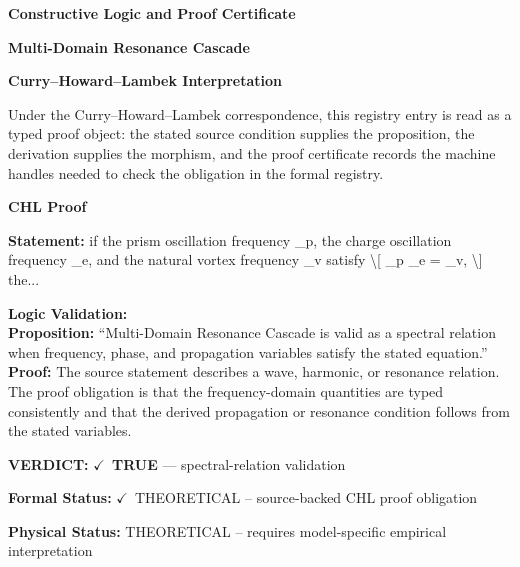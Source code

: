 \clearpage
\begingroup\tzpsupportsetup
\noindent\textbf{\fontsize{10.8pt}{12.8pt}\selectfont [ID 0127] Constructive Logic and Proof Certificate}\par
\noindent\textbf{\fontsize{10pt}{12pt}\selectfont Multi-Domain Resonance Cascade}\par
\vspace{0.45em}
\begingroup
\footnotesize
\setlength{\parskip}{0.22em}
\setlength{\parindent}{0pt}
\noindent\textbf{Curry--Howard--Lambek Interpretation}\par
Under the Curry--Howard--Lambek correspondence, this registry entry is read as a typed proof
object: the stated source condition supplies the proposition, the derivation supplies the
morphism, and the proof certificate records the machine handles needed to check the obligation
in the formal registry.

\vspace{0.45em}
\noindent\textbf{CHL Proof}\par
\textbf{Statement:} if the prism oscillation frequency \_p, the charge oscillation frequency \_e, and the
natural vortex frequency \_v satisfy \textbackslash{}[ \_p \_e = \_v, \textbackslash{}] the...

\textbf{Logic Validation:}\\
\textbf{Proposition:} ``Multi-Domain Resonance Cascade is valid as a spectral relation when frequency, phase,
and propagation variables satisfy the stated equation.''\\
\textbf{Proof:} The source statement describes a wave, harmonic, or resonance relation. The proof
obligation is that the frequency-domain quantities are typed consistently and that the
derived propagation or resonance condition follows from the stated variables.

\textbf{VERDICT:} \ensuremath{\checkmark}\ \textbf{TRUE} --- spectral-relation validation

\textbf{Formal Status:} \ensuremath{\checkmark}\ THEORETICAL -- source-backed CHL proof obligation

\textbf{Physical Status:} THEORETICAL -- requires model-specific empirical interpretation
\par\vspace{0.45em}
\par
\ifTZPDarkEdition
{}
\fi
\endgroup
\endgroup
